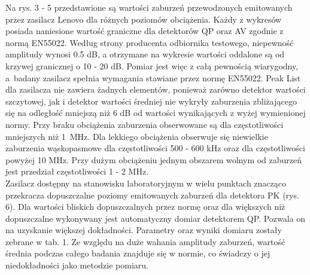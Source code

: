 \documentclass[12pt, a4paper, oneside]{article}
\begin{document}
Na rys. 3 - 5 przedstawione są wartości zaburzeń przewodzonych emitowanych przez zasilacz Lenovo dla różnych poziomów obciążenia. Każdy z wykresów posiada naniesione wartość graniczne dla detektorów QP oraz AV zgodnie z normą EN55022. Według strony producenta odbiornika testowego, niepewność amplitudy wynosi 0.5 dB, a otrzymane na wykresie wartości oddalone są od krzywej granicznej o 10 - 20 dB. Pomiar jest więc z całą pewnością wiarygodny, a~badany zasilacz spełnia wymagania stawiane przez normę EN55022. Peak List dla zasilacza nie zawiera żadnych elementów, ponieważ zarówno detektor wartości szczytowej, jak i detektor wartości średniej nie wykryły zaburzenia zbliżającego się na odległość mniejszą niż 6 dB od wartości wynikających z wyżej wymienionej normy. Przy braku obciążenia zaburzenia obserwowane są dla częstotliwości mniejszych niż 1~MHz. Dla lekkiego obciążenia obserwuje się niewielkie zaburzenia wąskopasmowe dla częstotliwości 500 - 600 kHz oraz dla częstotliwości powyżej 10 MHz. Przy dużym obciążeniu jednym obszarem wolnym od zaburzeń jest przedział częstotliwości 1 - 2 MHz.\\
\indent Zasilacz dostępny na stanowisku laboratoryjnym w wielu punktach znacząco przekracza dopuszczalne poziomy emitowanych zaburzeń dla detektora PK (rys. 6). Dla wartości bliskich dopuszczalnych przez normę oraz dla większych niż dopuszczalne wykonywany jest automatyczny domiar detektorem QP. Pozwala on na uzyskanie większej dokładności. Parametry oraz wyniki domiaru zostały zebrane w tab. 1. Ze względu na duże wahania amplitudy zaburzeń, wartość średnia podczas całego badania znajduje się w normie, co świadczy o jej niedokładności jako metodzie pomiaru.
\end{document}
